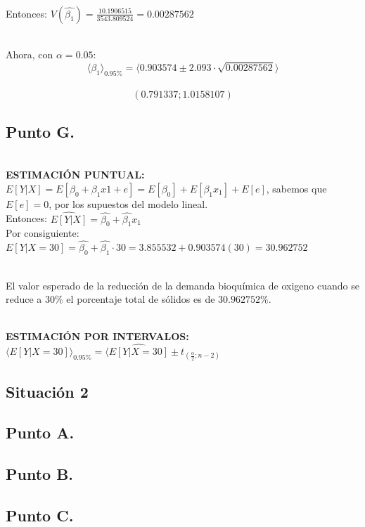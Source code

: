 \documentclass[letterpaper,12pt,onecolumn,titlepage]{article}
\begin{document}
~\\ Entonces: $V(\hat{\beta_{1}})=\frac{10.1906515}{3543.809524}=0.00287562$

~\\ Ahora, con $\alpha=0.05$:
~\\ $$\langle \beta_{1} \rangle_{0.95\%}=\langle 0.903574 \pm 2.093\cdot \sqrt{0.00287562} \rangle$$
~\\ $$(0.791337 ; 1.0158107) $$
\subsection{Punto G.}
~\\ \textbf{ESTIMACI\'{O}N PUNTUAL:}
~\\ $E[Y|X]=E[\beta_{0}+\beta_{1}x1+e]=E[\beta_{0}]+E[\beta_{1}x_{1}]+E[e]$, sabemos que $E[e]=0$, por los supuestos del modelo lineal.
~\\ Entonces: $\hat{E[Y|X]}=\hat{\beta_{0}}+\hat{\beta_{1}}x_{1}$
~\\ Por consiguiente: $E[Y|X=30]=\hat{\beta_{0}}+\hat{\beta_{1}}\cdot 30=3.855532+0.903574(30)=30.962752$

~\\ El valor esperado de la reducci\'{o}n de la demanda bioqu\'{i}mica de oxigeno cuando se reduce a $30\%$ el porcentaje total de s\'{o}lidos es de $30.962752\%$.


~\\ \textbf{ESTIMACI\'{O}N POR INTERVALOS:}
~\\ $\langle E[Y|X=30] \rangle_{0.95\%}=\langle \hat{E[Y|X=30]} \pm t_{(\frac{\alpha}{2};n-2)} $

\pagebreak\subsection{Situaci\'{o}n 2}
\subsection{Punto A.}
\subsection{Punto B.}
\subsection{Punto C.}


\end{document}
